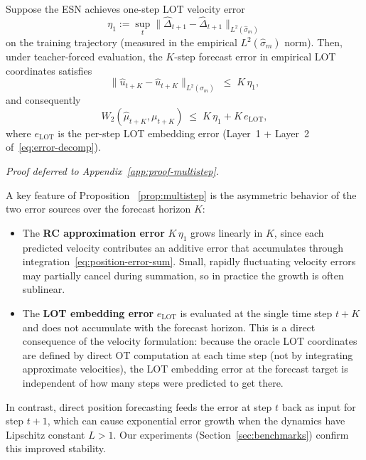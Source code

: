 \documentclass[11pt]{article}
\newcommand{\1}{\mathbf{1}}
\begin{document}
\begin{proposition}\label{prop:multistep}
Suppose the ESN achieves one-step LOT velocity error
\[
  \eta_1 := \sup_t
  \|\widehat{\Delta}_{t+1} - \hat{\Delta}_{t+1}\|_{L^2(\hat{\sigma}_m)}
\]
on the training trajectory (measured in the empirical $L^2(\hat{\sigma}_m)$
norm). Then, under teacher-forced evaluation, the $K$-step forecast error
in empirical LOT coordinates satisfies
\begin{equation}\label{eq:multistep-bound}
  \|\widehat{u}_{t+K} - \hat{u}_{t+K}\|_{L^2(\hat{\sigma}_m)}
  \;\leq\; K \, \eta_1,
\end{equation}
and consequently
\begin{equation}\label{eq:multistep-w2}
  W_2(\widehat{\mu}_{t+K}, \mu_{t+K})
  \;\leq\; K\,\eta_1 + K\,e_{\mathrm{LOT}},
\end{equation}
where $e_{\mathrm{LOT}}$ is the per-step LOT embedding error (Layer~1 +
Layer~2 of~\eqref{eq:error-decomp}).
\end{proposition}
\noindent\emph{Proof deferred to Appendix~\ref{app:proof-multistep}.}

\begin{remark}\label{rem:linear-growth}
A key feature of Proposition ~\ref{prop:multistep} is the asymmetric
behavior of the two error sources over the forecast horizon $K$:
\begin{itemize}
  \item The \textbf{RC approximation error} $K\,\eta_1$ grows linearly in
        $K$, since each predicted velocity contributes an additive error
        that accumulates through
        integration~\eqref{eq:position-error-sum}.  Small,
        rapidly fluctuating velocity errors may partially cancel during
        summation, so in practice the growth is often sublinear.
  \item The \textbf{LOT embedding error} $e_{\mathrm{LOT}}$ is evaluated
        at the single time step $t+K$ and does not accumulate with the
        forecast horizon.  This is a direct consequence of the velocity
        formulation: because the oracle LOT coordinates are defined by
        direct OT computation at each time step (not by integrating
        approximate velocities), the LOT embedding error at the forecast
        target is independent of how many steps were predicted to get
        there.
\end{itemize}
In contrast, direct position forecasting feeds the error at step $t$ back as input for step $t+1$, which can cause exponential error growth when the dynamics have Lipschitz constant $L > 1$. Our experiments (Section~\ref{sec:benchmarks}) confirm this improved stability. 
\end{remark}
\end{document}
